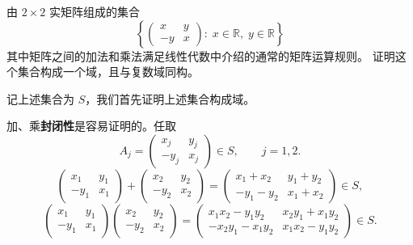 

\begin{question}
由 \(2\times 2\) 实矩阵组成的集合
\[
\left\{\begin{pmatrix} x & y \\ -y & x \end{pmatrix}:\; x\in\mathbb{R},\; y\in\mathbb{R}\right\}
\]
其中矩阵之间的加法和乘法满足线性代数中介绍的通常的矩阵运算规则。
证明这个集合构成一个域，且与复数域同构。
\begin{solution}
记上述集合为 \(S\)，我们首先证明上述集合构成域。

加、乘\textbf{封闭性}是容易证明的。任取
\[
A_j=\begin{pmatrix}x_j&y_j\\-y_j&x_j\end{pmatrix}\in S,
\qquad j=1,2.
\]
\[
\begin{pmatrix} x_1 & y_1 \\ -y_1 & x_1 \end{pmatrix}
+\begin{pmatrix} x_2 & y_2 \\ -y_2 & x_2 \end{pmatrix}
=\begin{pmatrix} x_1+x_2 & y_1+y_2 \\ -y_1-y_2 & x_1+x_2 \end{pmatrix}\in S,
\]
\[
\begin{pmatrix} x_1 & y_1 \\ -y_1 & x_1 \end{pmatrix}
\begin{pmatrix} x_2 & y_2 \\ -y_2 & x_2 \end{pmatrix}
=\begin{pmatrix} x_1x_2-y_1y_2 & x_2y_1+x_1y_2 \\ -x_2y_1-x_1y_2 & x_1x_2-y_1y_2 \end{pmatrix}\in S.
\]


\end{solution}
\end{question}
